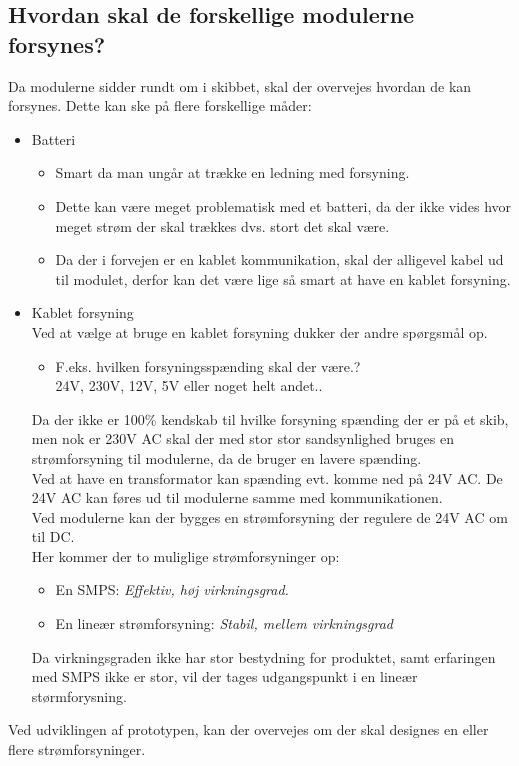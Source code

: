 \subsection{Hvordan skal de forskellige modulerne forsynes?}
Da modulerne sidder rundt om i skibbet, skal der overvejes hvordan de kan forsynes. Dette kan ske på flere forskellige måder:
\begin{itemize}
\item Batteri
	\begin{itemize}
	\item Smart da man ungår at trække en ledning med forsyning.
	\item Dette kan være meget problematisk med et batteri, da der ikke vides hvor meget strøm der skal trækkes dvs. stort det skal være. 
	\item Da der i forvejen er en kablet kommunikation, skal der alligevel kabel ud til modulet, derfor kan det være lige så smart at have en kablet forsyning.
	\end{itemize}
\item Kablet forsyning \\
Ved at vælge at bruge en kablet forsyning dukker der andre spørgsmål op.
\begin{itemize}
\item F.eks. hvilken forsyningsspænding skal der være.?\\
24V, 230V, 12V, 5V eller noget helt andet..
\end{itemize}
Da der ikke er 100\% kendskab til hvilke forsyning spænding der er på et skib, men nok er 230V AC skal der med stor stor sandsynlighed bruges en strømforsyning til modulerne, da de bruger en lavere spænding. \\
Ved at have en transformator kan spænding evt. komme ned på 24V AC. De 24V AC kan føres ud til modulerne samme med kommunikationen. \\
Ved modulerne kan der bygges en strømforsyning der regulere de 24V AC om til DC. \\
Her kommer der to muliglige strømforsyninger op:
\begin{itemize}
\item En SMPS: \textit{Effektiv, høj virkningsgrad.}
\item En lineær strømforsyning: \textit{Stabil, mellem virkningsgrad}
\end{itemize}
Da virkningsgraden ikke har stor bestydning for produktet, samt erfaringen med SMPS ikke er stor, vil der tages udgangspunkt i en lineær størmforysning.
\end{itemize}
Ved udviklingen af prototypen, kan der overvejes om der skal designes en eller flere strømforsyninger.


